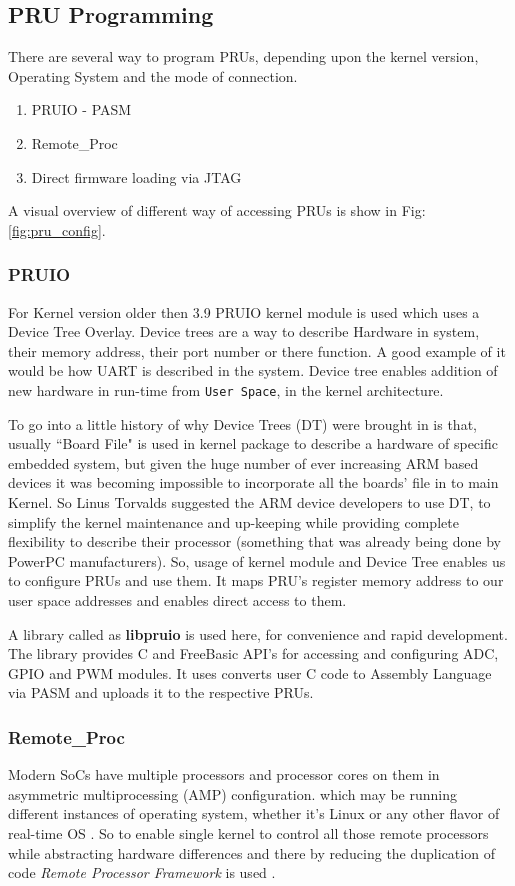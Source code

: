 \subsection{PRU Programming}
There are several way to program PRUs, depending upon the kernel version, Operating System and the mode of connection.
\begin{enumerate}
	\item PRUIO - PASM 
	\item Remote\_Proc
	\item Direct firmware loading via JTAG
\end{enumerate}

A visual overview of different way of accessing PRUs is show in Fig: \ref{fig:pru_config}.
\subsubsection{PRUIO}
 For Kernel version older then 3.9 PRUIO kernel module is used which uses a Device Tree Overlay. Device trees are a way to describe Hardware in system, their memory address, their port number or there function. A good example of it would be how UART is described in the system. Device tree enables addition of new hardware in run-time from \texttt{User Space}, in the kernel architecture. 
 
 To go into a little history of why Device Trees (DT) were brought in is that, usually ``Board File" is used in kernel package to describe a hardware of specific embedded system, but given the huge number of ever increasing ARM based devices it was becoming impossible to incorporate all the boards' file in to main Kernel. So Linus Torvalds \cite{DThist} suggested the ARM device developers to use DT, to simplify the kernel maintenance and up-keeping while providing complete flexibility to describe their processor (something that was already being done by PowerPC manufacturers). So, usage of kernel module and Device Tree enables us to configure PRUs and use them. It maps PRU's register memory address to our user space addresses and enables direct access to them. 
 
 A library  called as \textbf{libpruio} \cite{libpruio} is used here, for convenience and rapid development. The library provides C and FreeBasic API's for accessing and configuring ADC, GPIO and PWM modules. It uses converts user C code to Assembly Language via PASM and uploads it to the respective PRUs.
 
 \subsubsection{Remote\_Proc}
 Modern SoCs have multiple processors and processor cores on them in asymmetric multiprocessing (AMP) configuration. which may be running different instances  of operating system, whether it's Linux or any other flavor of real-time OS  . So to enable single kernel to control all those remote processors while abstracting hardware differences and there by reducing the duplication of code \textit{Remote Processor Framework} is used \cite{remoteproc}.
 
